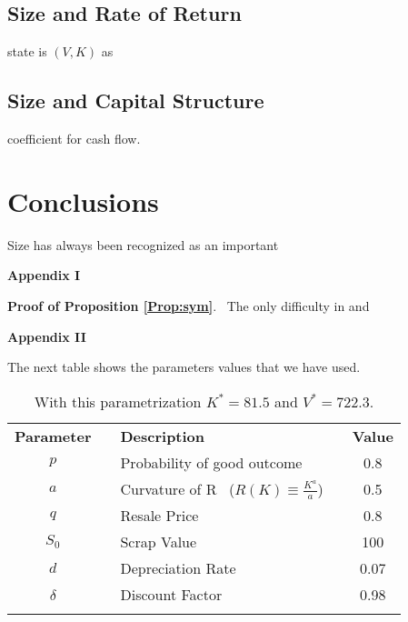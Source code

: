 \documentclass[12pt]{article}
\begin{document}
\subsection{Size and Rate of Return}

state is $(V,K) $ as%


\subsection{Size and Capital Structure}

coefficient for cash flow.

\section{Conclusions}

\label{conclusions}Size has always been recognized as an important

\newpage

\begin{center}
\textbf{\Large Appendix I}\bigskip
\end{center}

\bigskip

\noindent \textbf{Proof of Proposition \ref{Prop:sym}}. \ The only
difficulty in
and 
\newpage

\begin{center}
\textbf{\Large Appendix II}\bigskip
\end{center}

The next table shows the parameters values that we have used.

\begin{table}[]
\centering
\begin{tabular}{ccllc}
\textbf{Parameter} &  & \textbf{Description} &  & \textbf{Value} \\[3pt] 
\cmidrule{1-1}\cmidrule{3-3}\cmidrule{5-5} $p$ &  & Probability of good
outcome &  & 0.8 \\[3pt] 
$a$ &  & Curvature of R \ ($R(K) \equiv \frac{K^a}{a} $) &  & 0.5 \\[3pt] 
$q$ &  & Resale Price &  & 0.8 \\[3pt] 
$S_0$ &  & Scrap Value &  & 100 \\[3pt] 
$d$ &  & Depreciation Rate &  & 0.07 \\[3pt] 
$\delta$ &  & Discount Factor &  & 0.98 \\ 
\bottomrule &  &  &  & 
\end{tabular}%
\caption{With this parametrization $K^*=81.5$ and $V^*=722.3$.}
\label{tab:calibration}
\end{table}
\end{document}
